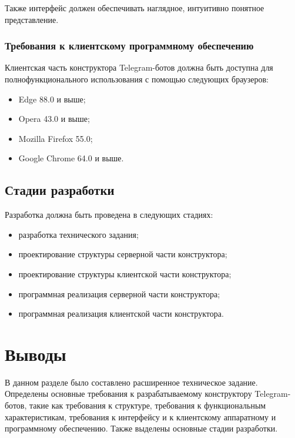 Также интерфейс должен обеспечивать
наглядное, интуитивно понятное представление.

\subsubsection{Требования к клиентскому программному обеспечению}

Клиентская часть конструктора Telegram-ботов должна быть доступна для
полнофункционального использования с помощью следующих браузеров:
\begin{itemize}
	\item Edge 88.0 и выше;
	\item Opera 43.0 и выше;
	\item Mozilla Firefox 55.0;
	\item Google Chrome 64.0 и выше.
\end{itemize}

\subsection{Стадии разработки}

Разработка должна быть проведена в следующих стадиях:
\begin{itemize}
	\item разработка технического задания;
	\item проектирование структуры серверной части конструктора;
	\item проектирование структуры клиентской части конструктора;
	\item программная реализация серверной части конструктора;
	\item программная реализация клиентской части конструктора.
\end{itemize}

\section*{Выводы}

В данном разделе было составлено расширенное техническое задание.
Определены основные требования к разрабатываемому конструктору Telegram-ботов, такие как
требования к структуре, требования к функциональным характеристикам,
требования к интерфейсу и к
клиентскому аппаратному и программному обеспечению.
Также выделены основные стадии разработки.


